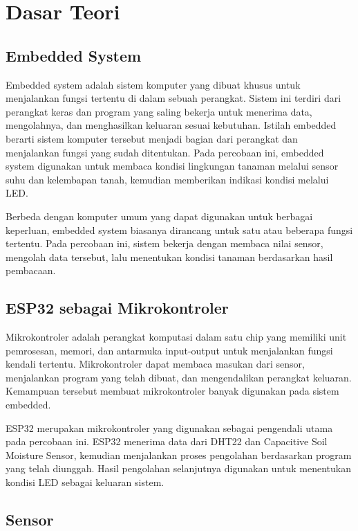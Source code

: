 \documentclass[12pt,a4paper]{article}
\begin{document}
\FloatBarrier

\section{Dasar Teori}

\subsection{Embedded System}

Embedded system adalah sistem komputer yang dibuat khusus untuk menjalankan fungsi tertentu di dalam sebuah perangkat. Sistem ini terdiri dari perangkat keras dan program yang saling bekerja untuk menerima data, mengolahnya, dan menghasilkan keluaran sesuai kebutuhan. Istilah embedded berarti sistem komputer tersebut menjadi bagian dari perangkat dan menjalankan fungsi yang sudah ditentukan. Pada percobaan ini, embedded system digunakan untuk membaca kondisi lingkungan tanaman melalui sensor suhu dan kelembapan tanah, kemudian memberikan indikasi kondisi melalui LED.

Berbeda dengan komputer umum yang dapat digunakan untuk berbagai keperluan, embedded system biasanya dirancang untuk satu atau beberapa fungsi tertentu. Pada percobaan ini, sistem bekerja dengan membaca nilai sensor, mengolah data tersebut, lalu menentukan kondisi tanaman berdasarkan hasil pembacaan.
\subsection{ESP32 sebagai Mikrokontroler}

Mikrokontroler adalah perangkat komputasi dalam satu chip yang memiliki unit pemrosesan, memori, dan antarmuka input-output untuk menjalankan fungsi kendali tertentu. Mikrokontroler dapat membaca masukan dari sensor, menjalankan program yang telah dibuat, dan mengendalikan perangkat keluaran. Kemampuan tersebut membuat mikrokontroler banyak digunakan pada sistem embedded.

ESP32 merupakan mikrokontroler yang digunakan sebagai pengendali utama pada percobaan ini. ESP32 menerima data dari DHT22 dan Capacitive Soil Moisture Sensor, kemudian menjalankan proses pengolahan berdasarkan program yang telah diunggah. Hasil pengolahan selanjutnya digunakan untuk menentukan kondisi LED sebagai keluaran sistem.

\subsection{Sensor}
\end{document}
